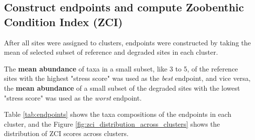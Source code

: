\subsection{Construct endpoints and compute Zoobenthic Condition Index (ZCI)}

After all sites were assigned to clusters,
endpoints were constructed by taking the mean of selected 
subset of reference and degraded sites in each cluster.

The \textbf{mean abundance} of taxa in a small subset, like 3 to 5, of the reference sites with the highest 
"stress score" was used as the \textit{best} endpoint,
and vice versa,
the \textbf{mean abundance} of a small subset of the 
degraded sites with the lowest "stress score" was used as the \textit{worst} endpoint.

Table \textcolor{blue}{\ref{tab:endpoints}} shows the taxa compositions of the endpoints in each cluster,
and the Figure \textcolor{blue}{\ref{fig:zci_distribution_across_clusters}} shows the distribution of ZCI scores across clusters.

